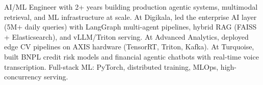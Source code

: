 \small{AI/ML Engineer with 2+ years building production agentic systems, multimodal retrieval, and ML infrastructure at scale. At Digikala, led the enterprise AI layer (5M+ daily queries) with LangGraph multi-agent pipelines, hybrid RAG (FAISS + Elasticsearch), and vLLM/Triton serving. At Advanced Analytics, deployed edge CV pipelines on AXIS hardware (TensorRT, Triton, Kafka). At Turquoise, built BNPL credit risk models and financial agentic chatbots with real-time voice transcription. Full-stack ML: PyTorch, distributed training, MLOps, high-concurrency serving.}\vspace{3pt}